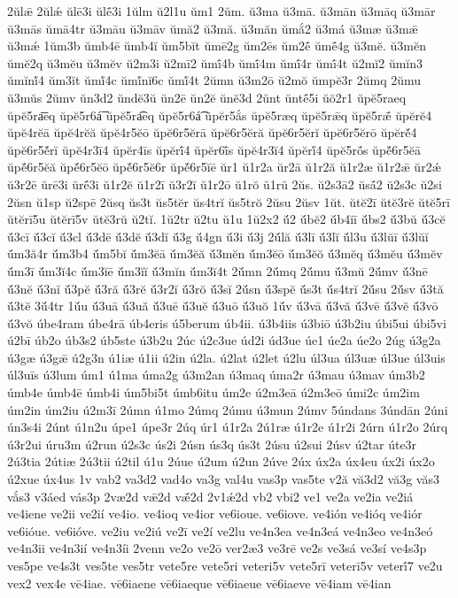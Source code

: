{2ŭlǣ
2ŭlǽ
ŭlē3i
ŭlḗ3i
1ŭlm
ŭ2l1u
ŭm1
2ŭm.
ŭ3ma
ŭ3mā.
ŭ3mān
ŭ3māq
ŭ3mār
ŭ3mās
ŭmā4tr
ŭ3māu
ŭ3māv
ŭmă2
ŭ3mă.
ŭ3măn
ŭmắ2
ŭ3má
ŭ3mæ
ŭ3mǣ
ŭ3mǽ
1ŭm3b
ŭmb4ē
ŭmb4ĭ
ŭm5bĭt
ŭmē2g
ŭm2ēs
ŭm2ḗ
ŭmḗ4g
ŭ3mĕ.
ŭ3mĕn
ŭmĕ2q
ŭ3mĕu
ŭ3mĕv
ŭ2m3i
ŭ2mī2
ŭmī́4b
ŭmī́4m
ŭmī́4r
ŭmī́4t
ŭ2mĭ2
ŭmĭn3
ŭmĭnĭ́4
ŭm3ĭt
ŭmĭ́4c
ŭmĭ́nĭ6c
ŭmĭ́4t
2ŭmn
ŭ3m2ō
ŭ2mŏ
ŭmpĕ3r
2ŭmq
2ŭmu
ŭ3mŭs
2ŭmv
ŭn3d2
ŭndĕ3ŭ
ŭn2ē
ŭn2ĕ
ŭnĕ3d
2ŭnt
ŭntḗ5i
ŭŏ2r1
ŭpĕ5raeq
ŭpĕ5ra͞eq
ŭpĕ5r6á͞
ŭpĕ5ra͡eq
ŭpĕ5r6á͡
ŭpĕr5ắs
ŭpĕ5ræq
ŭpĕ5rǣq
ŭpĕ5rǣ́
ŭpĕrĕ4
ŭpĕ4rĕā
ŭpĕ4rĕă
ŭpĕ4r5ĕō
ŭpĕ6r5ĕrā
ŭpĕ6r5ĕră
ŭpĕ6r5ĕrĭ
ŭpĕ6r5ĕrō
ŭpĕrĕ́4
ŭpĕ6r5ĕ́rĭ
ŭpĕ4r3ī4
ŭpĕr4īs
ŭpĕrī́4
ŭpĕr6ī́s
ŭpĕ4r3ĭ4
ŭpĕrĭ́4
ŭpĕ5rṓs
ŭpĕ́6r5ĕā
ŭpĕ́6r5ĕă
ŭpĕ́6r5ĕō
ŭpĕ́6r5ĕ6r
ŭpĕ́6r5ĭē
ŭr1
ŭ1r2a
ŭr2ā
ŭ1r2ă
ŭ1r2æ
ŭ1r2ǣ
ŭr2ǽ
ŭ3r2ē
ŭrē3i
ŭrḗ3i
ŭ1r2ĕ
ŭ1r2ī
ŭ3r2ĭ
ŭ1r2ō
ŭ1rŏ
ŭ1rŭ
2ŭs.
ŭ2s3ā2
ŭsā́2
ŭ2s3c
ŭ2si
2ŭsn
ŭ1sp
ŭ2spē
2ŭsq
ŭs3t
ŭs5tĕr
ŭs4trĭ
ŭs5trŏ
2ŭsu
2ŭsv
1ŭt.
ŭtĕ2ī
ŭtĕ3rĕ
ŭtĕ5rī
ŭtĕrī5u
ŭtĕrī5v
ŭtĕ3rŭ
ŭ2tĭ.
1ŭ2tr
ŭ2tu
ŭ1u
1ŭ2x2
ŭ́2
ŭ́bĕ2
ŭ́b4ĭī
ŭ́bs2
ŭ́3bŭ
ŭ́3cĕ
ŭ́3cī
ŭ́3cĭ
ŭ́3cl
ŭ́3dē
ŭ́3dĕ
ŭ́3dĭ
ŭ́3g
ŭ́4gn
ŭ́3i
ŭ́3j
2ŭ́lă
ŭ́3lī
ŭ́3lĭ
ŭ́l3u
ŭ́3lŭī
ŭ́3lŭĭ
ŭ́m3ă4r
ŭ́m3b4
ŭ́m5bĭ
ŭ́m3ĕā
ŭ́m3ĕă
ŭ́3mĕn
ŭ́m3ĕō
ŭ́m3ĕŏ
ŭ́3mĕq
ŭ́3mĕu
ŭ́3mĕv
ŭ́m3ī
ŭ́m3ĭ4c
ŭ́m3ĭē
ŭ́m3ĭĭ
ŭ́3mĭn
ŭ́m3ĭ4t
2ŭ́mn
2ŭ́mq
2ŭ́mu
ŭ́3mŭ
2ŭ́mv
ŭ́3nē
ŭ́3nĕ
ŭ́3nĭ
ŭ́3pĕ
ŭ́3ră
ŭ́3rĕ
ŭ́3r2ĭ
ŭ́3rŏ
ŭ́3sĭ
2ŭ́sn
ŭ́3spĕ
ŭ́s3t
ŭ́s4trĭ
2ŭ́su
2ŭ́sv
ŭ́3tă
ŭ́3tĕ
3ŭ́4tr
1ŭ́u
ŭ́3uā
ŭ́3uă
ŭ́3uē
ŭ́3uĕ
ŭ́3uō
ŭ́3uŏ
1ŭ́v
ŭ́3vā
ŭ́3vă
ŭ́3vē
ŭ́3vĕ
ŭ́3vō
ŭ́3vŏ
úbe4ram
úbe4rā
úb4eris
ú5berum
úb4ii.
ú3b4iis
ú3biō
ú3b2iu
úbi5ui
úbi5vi
ú2bī
úb2o
úb3s2
úb5ste
ú3b2u
2úc
ú2c3ue
úd2i
úd3ue
úe1
úe2a
úe2o
2úg
ú3g2a
ú3gæ
ú3gǣ
ú2g3n
ú1iæ
ú1ii
ú2in
ú2la.
ú2lat
ú2let
ú2lu
úl3ua
úl3uæ
úl3ue
úl3uis
úl3uīs
ú3lum
úm1
ú1ma
úma2g
ú3m2an
ú3maq
úma2r
ú3mau
ú3mav
úm3b2
úmb4e
úmb4ē
úmb4i
úm5bi5t
úmb6itu
úm2e
ú2m3eā
ú2m3eō
úmi2c
úm2im
úm2in
úm2iu
ú2m3ī
2úmn
ú1mo
2úmq
2úmu
ú3mun
2úmv
5úndans
3úndān
2úni
ún3s4i
2únt
ú1n2u
úpe1
úpe3r
2úq
úr1
ú1r2a
2ú1ræ
ú1r2e
ú1r2i
2úrn
ú1r2o
2úrq
ú3r2ui
úru3m
ú2run
ú2s3c
ús2i
2úsn
ús3q
ús3t
2úsu
ú2sui
2úsv
ú2tar
úte3r
2ú3tia
2útiæ
2ú3tii
ú2til
ú1u
2úue
ú2um
ú2un
2úve
2úx
úx2a
úx4eu
úx2i
úx2o
ú2xue
úx4us
1v
vab2
va3d2
vad4o
va3g
val4u
vas3p
vas5te
v2ă
vă3d2
vă3g
văs3
vắs3
v3áed
vás3p
2væ2d
vǣ2d
vǣ́2d
2v1ǽ2d
vb2
vbi2
ve1
ve2a
ve2ia
ve2iá
ve4iene
ve2ii
ve2ií
ve4io.
ve4ioq
ve4ior
ve6ioue.
ve6iove.
ve4ión
ve4ióq
ve4iór
ve6ióue.
ve6ióve.
ve2iu
ve2iú
ve2ī
ve2í
ve2lu
ve4n3ea
ve4n3eá
ve4n3eo
ve4n3eó
ve4n3ii
ve4n3ií
ve4n3íi
2venn
ve2o
ve2ō
ver2æ3
ve3rē
ve2s
ve3sá
ve3sí
ve4s3p
ves5pe
ve4s3t
ves5te
ves5tr
vete5re
vete5ri
veteri5v
vete5rī
veterī5v
veterī́7
ve2u
vex2
vex4e
vē4iae.
vē6iaene
vē6iaeque
vē6iaeue
vē6iaeve
vē4iam
vē4ian
}
